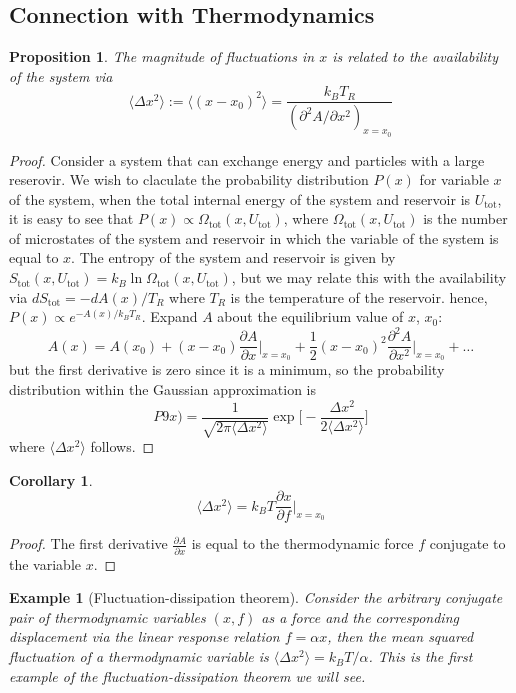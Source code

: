 \documentclass[a4paper]{article}
\newtheorem{eg}{Example}[section]
\theoremstyle{new}
\newtheorem{prop}{Proposition}[section]
\newtheorem{cor}{Corollary}[section]
\begin{document}
\subsection{Connection with Thermodynamics}
\begin{prop}
The magnitude of fluctuations in $x$ is related to the availability of the system via
$$\langle\Delta x^2\rangle:=\langle(x-x_0)^2\rangle=\frac{k_BT_R}{(\partial^2A/\partial x^2)_{x=x_0}}$$
\end{prop}
\begin{proof}
Consider a system that can exchange energy and particles with a large reserovir. We wish to claculate the probability distribution $P(x)$ for variable $x$ of the system, when the total internal energy of the system and reservoir is $U_{\text{tot}}$, it is easy to see that $P(x)\propto\Omega_{\text{tot}}(x,U_{\text{tot}})$, where $\Omega_{\text{tot}}(x,U_{\text{tot}})$ is the number of microstates of the system and reservoir in which the variable of the system is equal to $x$. The entropy of the system and reservoir is given by $S_{\text{tot}}(x,U_{\text{tot}})=k_B\ln\Omega_{\text{tot}}(x,U_{\text{tot}})$, but we may relate this with the availability via $dS_{\text{tot}}=-dA(x)/T_R$ where $T_R$ is the temperature of the reservoir. hence, $P(x)\propto e^{-A(x)/k_BT_R}$. Expand $A$ about the equilibrium value of $x$, $x_0$:
$$A(x)=A(x_0)+(x-x_0)\frac{\partial A}{\partial x}\bigg|_{x=x_0}+\frac{1}{2}(x-x_0)^2\frac{\partial^2A}{\partial x^2}\bigg|_{x=x_0}+\dots$$
but the first derivative is zero since it is a minimum, so the probability distribution within the Gaussian approximation is
$$P9x)=\frac{1}{\sqrt{2\pi\langle\Delta x^2\rangle}}\exp\bigg[-\frac{\Delta x^2}{2\langle\Delta x^2\rangle}\bigg]$$
where $\langle\Delta x^2\rangle$ follows.
\end{proof}
\begin{cor}
$$\langle\Delta x^2\rangle=k_BT\frac{\partial x}{\partial f}\bigg|_{x=x_0}$$
\end{cor}
\begin{proof}
The first derivative $\frac{\partial A}{\partial x}$ is equal to the thermodynamic force $f$ conjugate to the variable $x$. 
\end{proof}
\begin{eg}[Fluctuation-dissipation theorem]
Consider the arbitrary conjugate pair of thermodynamic variables $(x,f)$ as a force and the corresponding displacement via the linear response relation $f=\alpha x$, then the mean squared fluctuation of a thermodynamic variable is $\langle\Delta x^2\rangle=k_BT/\alpha$. This is the first example of the fluctuation-dissipation theorem we will see.
\end{eg}
\end{document}
